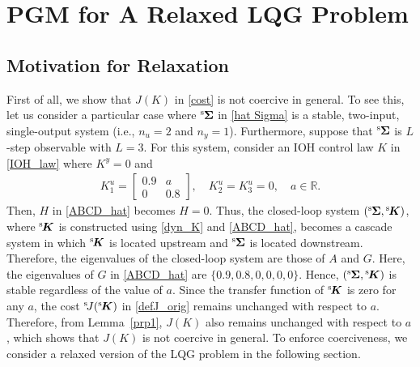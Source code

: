 \documentclass[preprint,5p,times,twocolumn]{elsarticle}
\newcommand{\bm}[1]{{\mbox{\boldmath $#1$}}}
\def\rms{{}^{\rm s}\hspace{-0.2mm}}
\def\rmsK{{}^{\rm s}\hspace{-0.4mm}}
\def\rmsJ{{}^{\rm s}\hspace{-0.5mm}}
\begin{document}
\section{PGM for A Relaxed LQG Problem}
\subsection{Motivation for Relaxation}\label{sec_non_coer}
First of all, we show that $J(K)$ in \eqref{cost} is not coercive in general. To see this, let us consider a particular case where $\rms{\bm \Sigma}$ in \eqref{hat Sigma} is a stable, two-input, single-output system (i.e., $n_u = 2$ and $n_y = 1$). Furthermore, suppose that $\rms{\bm \Sigma}$ is $L$-step observable with $L = 3$. For this system, consider an IOH control law $K$ in \eqref{IOH_law} where $K^{y} = 0$ and
\begin{align}
    K_1^u = \begin{bmatrix}
        0.9 & a \\
        0 & 0.8
    \end{bmatrix}, \quad
    K_2^u = K_3^u = 0, \quad a \in \mathbb{R}.
\end{align}
Then, $H$ in \eqref{ABCD_hat} becomes $H = 0$. Thus, the closed-loop system $(\rms{\bm \Sigma}, \rmsK{\bm K})$, where $\rmsK{\bm K}$ is constructed using \eqref{dyn_K} and \eqref{ABCD_hat}, becomes a cascade system in which $\rmsK{\bm K}$ is located upstream and $\rms{\bm \Sigma}$ is located downstream. Therefore, the eigenvalues of the closed-loop system are those of $A$ and $G$. Here, the eigenvalues of $G$ in \eqref{ABCD_hat} are $\{0.9, 0.8, 0, 0, 0, 0\}$. Hence, $(\rms{\bm \Sigma}, \rmsK{\bm K})$ is stable regardless of the value of $a$. Since the transfer function of $\rmsK{\bm K}$ is zero for any $a$, the cost $\rmsJ J(\rmsK{\bm K})$ in \eqref{defJ_orig} remains unchanged with respect to $a$. Therefore, from Lemma~\ref{prp1}, $J(K)$ also remains unchanged with respect to $a$, which shows that $J(K)$ is not coercive in general. To enforce coerciveness, we consider a relaxed version of the LQG problem in the following section.
\end{document}
